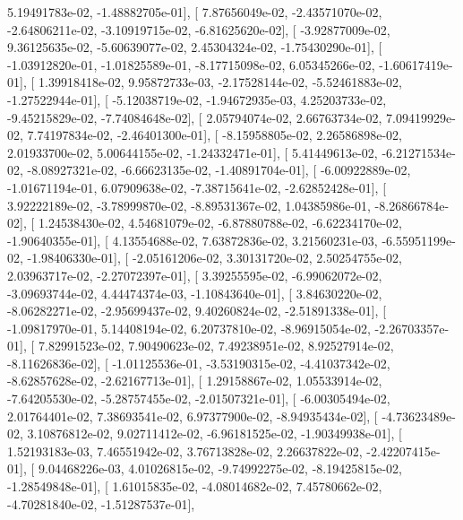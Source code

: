 \documentclass{article}
\begin{document}
          5.19491783e-02,  -1.48882705e-01],
       [  7.87656049e-02,  -2.43571070e-02,  -2.64806211e-02,
         -3.10919715e-02,  -6.81625620e-02],
       [ -3.92877009e-02,   9.36125635e-02,  -5.60639077e-02,
          2.45304324e-02,  -1.75430290e-01],
       [ -1.03912820e-01,  -1.01825589e-01,  -8.17715098e-02,
          6.05345266e-02,  -1.60617419e-01],
       [  1.39918418e-02,   9.95872733e-03,  -2.17528144e-02,
         -5.52461883e-02,  -1.27522944e-01],
       [ -5.12038719e-02,  -1.94672935e-03,   4.25203733e-02,
         -9.45215829e-02,  -7.74084648e-02],
       [  2.05794074e-02,   2.66763734e-02,   7.09419929e-02,
          7.74197834e-02,  -2.46401300e-01],
       [ -8.15958805e-02,   2.26586898e-02,   2.01933700e-02,
          5.00644155e-02,  -1.24332471e-01],
       [  5.41449613e-02,  -6.21271534e-02,  -8.08927321e-02,
         -6.66623135e-02,  -1.40891704e-01],
       [ -6.00922889e-02,  -1.01671194e-01,   6.07909638e-02,
         -7.38715641e-02,  -2.62852428e-01],
       [  3.92222189e-02,  -3.78999870e-02,  -8.89531367e-02,
          1.04385986e-01,  -8.26866784e-02],
       [  1.24538430e-02,   4.54681079e-02,  -6.87880788e-02,
         -6.62234170e-02,  -1.90640355e-01],
       [  4.13554688e-02,   7.63872836e-02,   3.21560231e-03,
         -6.55951199e-02,  -1.98406330e-01],
       [ -2.05161206e-02,   3.30131720e-02,   2.50254755e-02,
          2.03963717e-02,  -2.27072397e-01],
       [  3.39255595e-02,  -6.99062072e-02,  -3.09693744e-02,
          4.44474374e-03,  -1.10843640e-01],
       [  3.84630220e-02,  -8.06282271e-02,  -2.95699437e-02,
          9.40260824e-02,  -2.51891338e-01],
       [ -1.09817970e-01,   5.14408194e-02,   6.20737810e-02,
         -8.96915054e-02,  -2.26703357e-01],
       [  7.82991523e-02,   7.90490623e-02,   7.49238951e-02,
          8.92527914e-02,  -8.11626836e-02],
       [ -1.01125536e-01,  -3.53190315e-02,  -4.41037342e-02,
         -8.62857628e-02,  -2.62167713e-01],
       [  1.29158867e-02,   1.05533914e-02,  -7.64205530e-02,
         -5.28757455e-02,  -2.01507321e-01],
       [ -6.00305494e-02,   2.01764401e-02,   7.38693541e-02,
          6.97377900e-02,  -8.94935434e-02],
       [ -4.73623489e-02,   3.10876812e-02,   9.02711412e-02,
         -6.96181525e-02,  -1.90349938e-01],
       [  1.52193183e-03,   7.46551942e-02,   3.76713828e-02,
          2.26637822e-02,  -2.42207415e-01],
       [  9.04468226e-03,   4.01026815e-02,  -9.74992275e-02,
         -8.19425815e-02,  -1.28549848e-01],
       [  1.61015835e-02,  -4.08014682e-02,   7.45780662e-02,
         -4.70281840e-02,  -1.51287537e-01],
\end{document}
